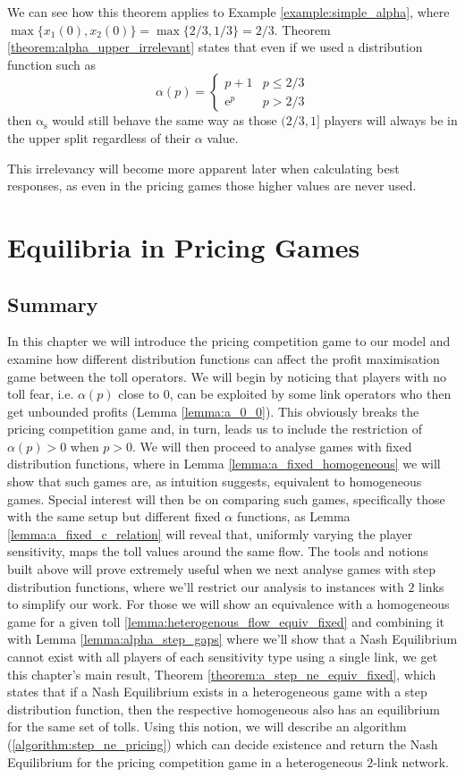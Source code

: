 \documentclass[10pt,a4paper]{book}
\newcommand{\as}{\mathrm{\alpha_s}}
\theoremstyle{definition}
\theoremstyle{comment}
\begin{document}
We can see how this theorem applies to Example \ref{example:simple_alpha}, where $\max\{x_1(0), x_2(0)\} = \max\{2/3, 1/3\} = 2/3$.
Theorem \ref{theorem:alpha_upper_irrelevant} states that even if we used a distribution function such as
\[
	\alpha(p) =
	\begin{cases}
		p + 1 & p \le 2/3 \\
		\mathrm{e}^p & p > 2/3
	\end{cases}
\]
then $\as$ would still behave the same way as those $(2/3, 1]$ players will always be in the upper split regardless of their $\alpha$ value.

This irrelevancy will become more apparent later when calculating best responses, as even in the pricing games those higher values are never used.

\cleardoublepage


\chapter{Equilibria in Pricing Games}
\label{chapter:pricing_equilibria}

\section*{Summary}

In this chapter we will introduce the pricing competition game to our model and examine how different distribution functions can affect the profit maximisation game between the toll operators.
We will begin by noticing that players with no toll fear, i.e. $\alpha(p)$ close to $0$, can be exploited by some link operators who then get unbounded profits (Lemma \ref{lemma:a_0_0}).
This obviously breaks the pricing competition game and, in turn, leads us to include the restriction of $\alpha(p) > 0$ when $p > 0$.
We will then proceed to analyse games with fixed distribution functions, where in Lemma \ref{lemma:a_fixed_homogeneous} we will show that such games are, as intuition suggests, equivalent to homogeneous games.
Special interest will then be on comparing such games, specifically those with the same setup but different fixed $\alpha$ functions, as Lemma \ref{lemma:a_fixed_c_relation} will reveal that, uniformly varying the player sensitivity, maps the toll values around the same flow.
The tools and notions built above will prove extremely useful when we next analyse games with step distribution functions, where we'll restrict our analysis to instances with $2$ links to simplify our work.
For those we will show an equivalence with a homogeneous game for a given toll \ref{lemma:heterogenous_flow_equiv_fixed} and combining it with Lemma \ref{lemma:alpha_step_gaps} where we'll show that a Nash Equilibrium cannot exist with all players of each sensitivity type using a single link, we get this chapter's main result, Theorem \ref{theorem:a_step_ne_equiv_fixed}, which states that if a Nash Equilibrium exists in a heterogeneous game with a step distribution function, then the respective homogeneous also has an equilibrium for the same set of tolls.
Using this notion, we will describe an algorithm (\ref{algorithm:step_ne_pricing}) which can decide existence and return the Nash Equilibrium for the pricing competition game in a heterogeneous $2$-link network.
\end{document}
